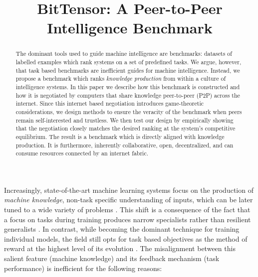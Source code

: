 \documentclass{article}
\title{BitTensor: A Peer-to-Peer Intelligence Benchmark}
\begin{document}
\maketitle

\begin{abstract}
The dominant tools used to guide machine intelligence are benchmarks: datasets of labelled examples which rank systems on a set of predefined tasks. We argue, however, that task based benchmarks are inefficient guides for machine intelligence. Instead, we propose a benchmark which ranks \textit{knowledge production} from within a culture of intelligence systems. In this paper we describe how this benchmark is constructed and how it is negotiated by computers that share knowledge peer-to-peer (P2P) across the internet. Since this internet based negotiation introduces game-theoretic considerations, we design methods to ensure the veracity of the benchmark when peers remain self-interested and trustless. We then test our design by empirically showing that the negotiation closely matches the desired ranking at the system's competitive equilibrium. The result is a benchmark which is directly aligned with knowledge production. It is furthermore, inherently collaborative, open, decentralized, and can consume resources connected by an internet fabric.
\end{abstract}

Increasingly, state-of-the-art machine learning systems focus on the production of \textit{machine knowledge}, non-task specific understanding of inputs, which can be later tuned to a wide variety of problems \cite{devlin2018bert}. This shift is a consequence of the fact that a focus on tasks during training produces narrow specialists rather than resilient generalists \cite{radford2019language}. In contrast, while becoming the dominant technique for training individual models, the field still opts for task based objectives as the method of reward at the highest level of its evolution \cite{wang2018glue}. The misalignment between this salient feature (machine knowledge) and its feedback mechanism (task performance) is inefficient for the following reasons:
\end{document}
